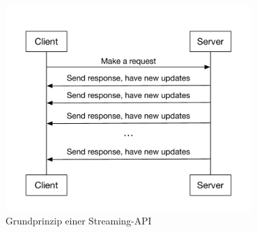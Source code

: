\begin{figure}[!h]
    \centering
    \includegraphics[width=0.85\textwidth]{Graphics/streaming_api}
    \caption{Grundprinzip einer Streaming-API}
   \label{fig:streamapi}
\end{figure}


